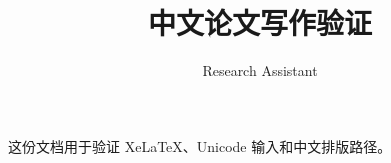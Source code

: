 \documentclass[fontset=fandol]{ctexart}
\title{中文论文写作验证}
\author{Research Assistant}
\begin{document}
\maketitle

这份文档用于验证 XeLaTeX、Unicode 输入和中文排版路径。
\end{document}
